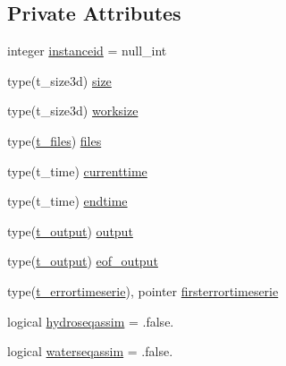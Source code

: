 \subsection*{Private Attributes}
\begin{DoxyCompactItemize}
\item 
integer \mbox{\hyperlink{structmodulesequentialassimilation_1_1t__sequentialassimilation_aab1a0ea57cd595907f313d4e31c2d653}{instanceid}} = null\+\_\+int
\item 
type(t\+\_\+size3d) \mbox{\hyperlink{structmodulesequentialassimilation_1_1t__sequentialassimilation_a9984d46c7696f3ac252a19a872adb8b2}{size}}
\item 
type(t\+\_\+size3d) \mbox{\hyperlink{structmodulesequentialassimilation_1_1t__sequentialassimilation_a77516f639dc599681bee9849ccb83fe6}{worksize}}
\item 
type(\mbox{\hyperlink{structmodulesequentialassimilation_1_1t__files}{t\+\_\+files}}) \mbox{\hyperlink{structmodulesequentialassimilation_1_1t__sequentialassimilation_ae0604880381a97dcb270bc2f8fd9f264}{files}}
\item 
type(t\+\_\+time) \mbox{\hyperlink{structmodulesequentialassimilation_1_1t__sequentialassimilation_a1827e541d867e55247eb725f639503fc}{currenttime}}
\item 
type(t\+\_\+time) \mbox{\hyperlink{structmodulesequentialassimilation_1_1t__sequentialassimilation_a013a589c15030380d242f3100a7042d9}{endtime}}
\item 
type(\mbox{\hyperlink{structmodulesequentialassimilation_1_1t__output}{t\+\_\+output}}) \mbox{\hyperlink{structmodulesequentialassimilation_1_1t__sequentialassimilation_a65b7796d1c40af01322dcaee7b3aaa57}{output}}
\item 
type(\mbox{\hyperlink{structmodulesequentialassimilation_1_1t__output}{t\+\_\+output}}) \mbox{\hyperlink{structmodulesequentialassimilation_1_1t__sequentialassimilation_a24cb44422d8ea353a44b85a6d96c8f7d}{eof\+\_\+output}}
\item 
type(\mbox{\hyperlink{structmodulesequentialassimilation_1_1t__errortimeserie}{t\+\_\+errortimeserie}}), pointer \mbox{\hyperlink{structmodulesequentialassimilation_1_1t__sequentialassimilation_a11f6d08cf68fda68a74b733b7d7310f9}{firsterrortimeserie}}
\item 
logical \mbox{\hyperlink{structmodulesequentialassimilation_1_1t__sequentialassimilation_adb79f7885339264859970a5da2a5cb07}{hydroseqassim}} = .false.
\item 
logical \mbox{\hyperlink{structmodulesequentialassimilation_1_1t__sequentialassimilation_aff1687917a9617f7096d90ed463e447e}{waterseqassim}} = .false.

\end{DoxyCompactItemize}

